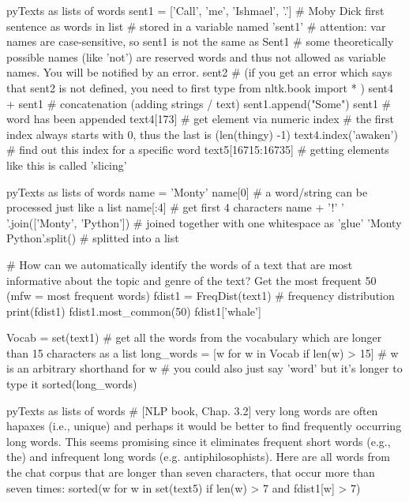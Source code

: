 \documentclass[10pt,a4paper]{article}
\begin{document}
\begin{multicols}{3}
\begin{codebox}{py}{Texts as lists of words}
sent1 = ['Call', 'me', 'Ishmael', '.'] # Moby Dick first sentence as words in list
# stored in a variable named 'sent1' 
# attention: var names are case-sensitive, so sent1 is not the same as Sent1
# some theoretically possible names (like 'not') are reserved words and thus not allowed as variable names. You will be notified by an error.
sent2 # (if you get an error which says that sent2 is not defined, you need to first type  from nltk.book import * ) 
sent4 + sent1 # concatenation (adding strings / text)
sent1.append("Some")
sent1 # word has been appended
text4[173] # get element via numeric index
# the first index always starts with 0, thus the last is (len(thingy) -1) 
text4.index('awaken') # find out this index for a specific word
text5[16715:16735] # getting elements like this is called 'slicing'
\end{codebox}

\begin{codebox}{py}{Texts as lists of words}
name = 'Monty'
name[0] # a word/string can be processed just like a list
name[:4] # get first 4 characters
name + '!'
' '.join(['Monty', 'Python']) # joined together with one whitespace as 'glue'
'Monty Python'.split() # splitted into a list

# How can we automatically identify the words of a text that are most informative about the topic and genre of the text? Get the most frequent 50 (mfw = most frequent words)
fdist1 = FreqDist(text1) # frequency distribution
print(fdist1)
fdist1.most_common(50)
fdist1['whale']

Vocab = set(text1)
# get all the words from the vocabulary which are longer than 15 characters as a list
long_words = [w for w in Vocab if len(w) > 15] 
# w is an arbitrary shorthand for w
# you could also just say 'word' but it's longer to type it
sorted(long_words)
\end{codebox}

\begin{codebox}{py}{Texts as lists of words}
# [NLP book, Chap. 3.2] very long words are often hapaxes (i.e., unique) and perhaps it would be better to find frequently occurring long words. This seems promising since it eliminates frequent short words (e.g., the) and infrequent long words (e.g. antiphilosophists). Here are all words from the chat corpus that are longer than seven characters, that occur more than seven times:
sorted(w for w in set(text5) if len(w) > 7 and fdist1[w] > 7)


\end{codebox}
\end{multicols}
\end{document}
